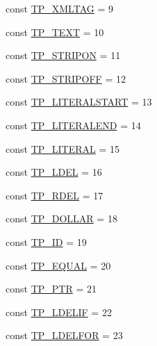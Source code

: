 \begin{DoxyCompactItemize}
\item 
const \hyperlink{class_smarty___internal___templateparser_a3e84c47da30815c92b574b2b64c85aba}{T\+P\+\_\+\+X\+M\+L\+T\+A\+G} = 9
\item 
const \hyperlink{class_smarty___internal___templateparser_a29644cfdab93ba787585492322629e08}{T\+P\+\_\+\+T\+E\+X\+T} = 10
\item 
const \hyperlink{class_smarty___internal___templateparser_a000ce395e024f456b22828c88ea3d338}{T\+P\+\_\+\+S\+T\+R\+I\+P\+O\+N} = 11
\item 
const \hyperlink{class_smarty___internal___templateparser_a26f332452cbac971deacab109003aeb5}{T\+P\+\_\+\+S\+T\+R\+I\+P\+O\+F\+F} = 12
\item 
const \hyperlink{class_smarty___internal___templateparser_ab79ad4c58771d924c0b94776c58f5087}{T\+P\+\_\+\+L\+I\+T\+E\+R\+A\+L\+S\+T\+A\+R\+T} = 13
\item 
const \hyperlink{class_smarty___internal___templateparser_ae981a7bc752c5a93f6ce22dfc66a6e41}{T\+P\+\_\+\+L\+I\+T\+E\+R\+A\+L\+E\+N\+D} = 14
\item 
const \hyperlink{class_smarty___internal___templateparser_a34b001619315454fb9496a1d764df93c}{T\+P\+\_\+\+L\+I\+T\+E\+R\+A\+L} = 15
\item 
const \hyperlink{class_smarty___internal___templateparser_ab49b763d4088f66df20117bd91eef9aa}{T\+P\+\_\+\+L\+D\+E\+L} = 16
\item 
const \hyperlink{class_smarty___internal___templateparser_ab25ec642bbe85fec2b76e3222b1c24bd}{T\+P\+\_\+\+R\+D\+E\+L} = 17
\item 
const \hyperlink{class_smarty___internal___templateparser_af135e91eb676f920bf10962ade66f01b}{T\+P\+\_\+\+D\+O\+L\+L\+A\+R} = 18
\item 
const \hyperlink{class_smarty___internal___templateparser_a7707dd3fd55c3deaa2705b5b35f77309}{T\+P\+\_\+\+I\+D} = 19
\item 
const \hyperlink{class_smarty___internal___templateparser_a531d17e9ed17bfd108de495a22952580}{T\+P\+\_\+\+E\+Q\+U\+A\+L} = 20
\item 
const \hyperlink{class_smarty___internal___templateparser_ae61261670b02b34b4caab237d00c0299}{T\+P\+\_\+\+P\+T\+R} = 21
\item 
const \hyperlink{class_smarty___internal___templateparser_af6d650e3b191cd95312ca711635e4658}{T\+P\+\_\+\+L\+D\+E\+L\+I\+F} = 22
\item 
const \hyperlink{class_smarty___internal___templateparser_a01c8c832be1d818b6f179fc4e70982d3}{T\+P\+\_\+\+L\+D\+E\+L\+F\+O\+R} = 23

\end{DoxyCompactItemize}
